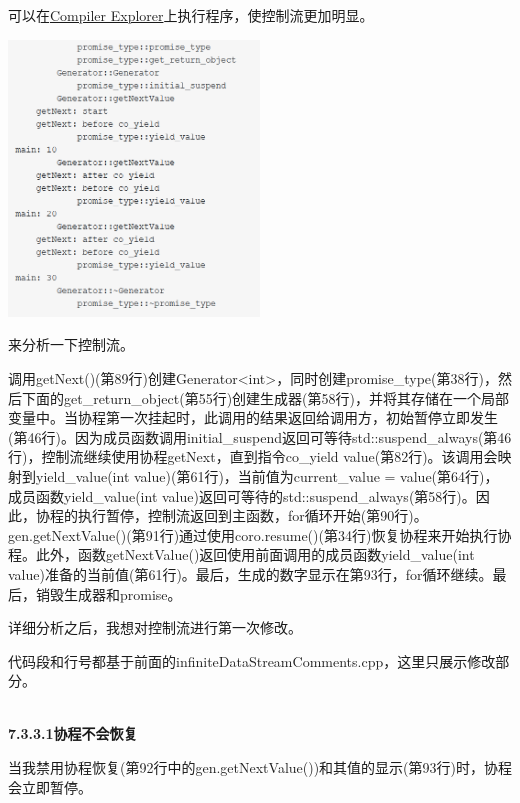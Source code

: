 可以在\href{https://godbolt.org/z/cTW9Gq}{Compiler Explorer}上执行程序，使控制流更加明显。

\begin{center}
\includegraphics[width=0.5\textwidth]{content/3/chapter7/images/14.png}\\
\end{center}

来分析一下控制流。

调用getNext()(第89行)创建Generator<int>，同时创建promise\_type(第38行)，然后下面的get\_return\_object(第55行)创建生成器(第58行)，并将其存储在一个局部变量中。当协程第一次挂起时，此调用的结果返回给调用方，初始暂停立即发生(第46行)。因为成员函数调用initial\_suspend返回可等待std::suspend\_always(第46行)，控制流继续使用协程getNext，直到指令co\_yield value(第82行)。该调用会映射到yield\_value(int value)(第61行)，当前值为current\_value = value(第64行)，成员函数yield\_value(int value)返回可等待的std::suspend\_always(第58行)。因此，协程的执行暂停，控制流返回到主函数，for循环开始(第90行)。gen.getNextValue()(第91行)通过使用coro.resume()(第34行)恢复协程来开始执行协程。此外，函数getNextValue()返回使用前面调用的成员函数yield\_value(int value)准备的当前值(第61行)。最后，生成的数字显示在第93行，for循环继续。最后，销毁生成器和promise。

详细分析之后，我想对控制流进行第一次修改。


代码段和行号都基于前面的infiniteDataStreamComments.cpp，这里只展示修改部分。

\hspace*{\fill} \\ %
\noindent
\textbf{7.3.3.1\hspace{0.2cm}协程不会恢复}

当我禁用协程恢复(第92行中的gen.getNextValue())和其值的显示(第93行)时，协程会立即暂停。

